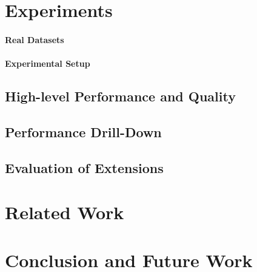 \documentclass{vldb}
\begin{document}
\section{Experiments}

\paragraph*{Real Datasets}

\paragraph*{Experimental Setup}

\subsection{High-level Performance and Quality}

\subsection{Performance Drill-Down}

\subsection{Evaluation of Extensions}



\section{Related Work}



\section{Conclusion and Future Work}



{
\scriptsize


}
\end{document}
